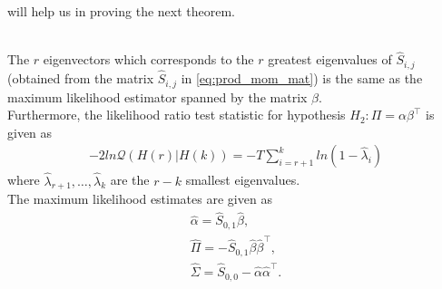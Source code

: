 will help us in proving the next theorem.
\begin{thm}{\phantom}\\
    The $r$ eigenvectors which corresponds to the $r$ greatest eigenvalues of $\hat{S}_{i,j}$ (obtained from the matrix $\hat{S}_{i,j}$ in \eqref{eq:prod_mom_mat}) is the same as the maximum likelihood estimator spanned by the matrix $\beta$.\\
    Furthermore, the likelihood ratio test statistic for hypothesis $H_2:\Pi=\alpha\beta^{\top}$ is given as 
    \begin{align}\label{eq:lrmax_coint_r}
        -2ln\mathcal{Q}(H(r)|H(k))=-T\sum_{i=r+1}^k ln(1-\hat{\lambda}_i)
    \end{align}
    where $\hat{\lambda}_{r+1},\ldots,\hat{\lambda}_{k}$ are the $r-k$ smallest eigenvalues.\\
    The maximum likelihood estimates are given as
    \begin{align*}
        \hat{\alpha}=\hat{S}_{0,1}\hat{\beta},\\
        \hat{\Pi}=-\hat{S}_{0,1}\hat{\beta}\hat{\beta}^\top,\\
        \hat{\Sigma}=\hat{S}_{0,0}-\hat{\alpha}\hat{\alpha}^\top.
    \end{align*}
\end{thm}
